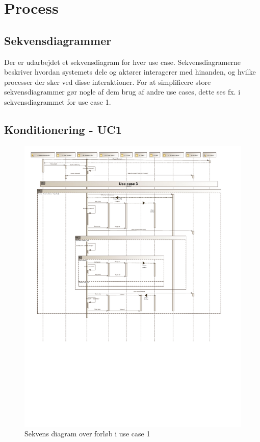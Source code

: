 \newpage
\section{Process}

\subsection{Sekvensdiagrammer}
Der er udarbejdet et sekvensdiagram for hver use case. Sekvensdiagramerne beskriver hvordan systemets dele og aktører interagerer med hinanden, og hvilke processer der sker ved disse interaktioner. 
For at simplificere store sekvensdiagrammer gør nogle af dem brug af andre use cases, dette ses fx. i sekvensdiagrammet for use case 1. 

\subsection{Konditionering - UC1} \hfil
\begin{figure}[H]
	\includegraphics[width=\textwidth ]{SystemArkitektur/pdfs/SD_UC1-crop.pdf}
	\caption{Sekvens diagram over forløb i use case 1}
\end{figure}
\newpage

